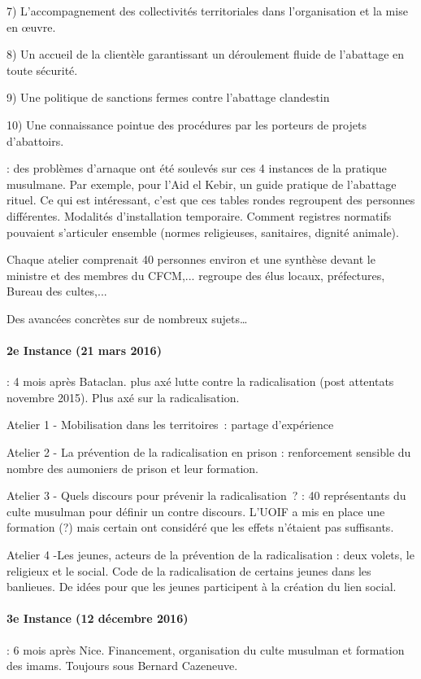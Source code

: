 \begin{enumerate}
{7) L’accompagnement des collectivités territoriales dans l’organisation et la mise en œuvre.

8) Un accueil de la clientèle garantissant un déroulement fluide de l’abattage en toute sécurité.

9) Une politique de sanctions fermes contre l’abattage clandestin

10) Une connaissance pointue des procédures par les porteurs de
projets d’abattoirs.} : des problèmes d'arnaque ont été soulevés sur ces 4 instances de la pratique musulmane. Par exemple, pour l'Aid el Kebir, un guide pratique de l'abattage rituel. Ce qui est intéressant, c'est que ces tables rondes regroupent des personnes différentes. Modalités d'installation temporaire. Comment registres normatifs pouvaient s'articuler ensemble (normes religieuses, sanitaires, dignité animale).
\end{enumerate} 
 Chaque atelier comprenait 40 personnes environ et une synthèse devant le ministre et des membres du CFCM,... regroupe des élus locaux, préfectures, Bureau des cultes,...

Des avancées concrètes sur de nombreux sujets…


\paragraph{2e Instance (21 mars 2016)} : 4 mois après Bataclan. plus axé lutte contre la radicalisation (post attentats novembre 2015). Plus axé sur la radicalisation. 
\bi 
    \item Atelier 1 - Mobilisation dans les territoires : partage d’expérience
    \item Atelier 2 - La prévention de la radicalisation en prison : renforcement sensible du nombre des aumoniers de prison et leur formation.
    \item Atelier 3 - Quels discours pour prévenir la radicalisation ? : 40 représentants du culte musulman pour définir un contre discours. L'UOIF a mis en place une formation (?) mais certain ont considéré que les effets n'étaient pas suffisants.
    \item Atelier 4  -Les jeunes, acteurs de la prévention de la radicalisation  : deux volets, le religieux et le social. Code de la radicalisation de certains jeunes dans les banlieues. De idées pour que les jeunes participent à la création du lien social. 
\ei 



\paragraph{3e Instance (12 décembre 2016)}: 6 mois après Nice. Financement, organisation du culte musulman et formation des imams. Toujours sous Bernard Cazeneuve. 

